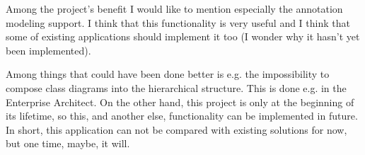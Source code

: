 Among the project's benefit I would like to mention especially the annotation modeling support. I think that this functionality is very useful and I think that some of existing applications should implement it too (I wonder why it hasn't yet been implemented).

Among things that could have been done better is e.g. the impossibility to compose class diagrams into the hierarchical structure. This is done e.g. in the Enterprise Architect. On the other hand, this project is only at the beginning of its lifetime, so this, and another else, functionality can be implemented in future. In short, this application can not be compared with existing solutions for now, but one time, maybe, it will.
